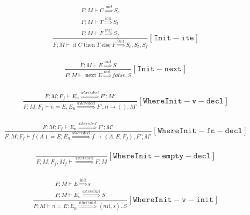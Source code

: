 \documentclass{scrartcl}
\DeclareMathOperator{\ifop}{if}
\DeclareMathOperator{\thenop}{then}
\DeclareMathOperator{\elseop}{else}
\DeclareMathOperator{\nextop}{next}
\begin{document}
    \begin{align*}
    \frac{
        \begin{matrix}
        F; M \vdash C \overset{init}{\Rightarrow} S_c \\
        F; M \vdash T \overset{init}{\Rightarrow} S_t \\
        F; M \vdash F \overset{init}{\Rightarrow} S_f
        \end{matrix}
    }{
        F; M \vdash \ifop C \thenop T \elseop F \overset{init}{\Rightarrow} S_c, S_t, S_f
    }[\mathtt{Init-ite}]
    \end{align*}
    
    \begin{align*}
    \frac{
        F; M \vdash E \overset{init}{\Rightarrow} S
    }{
        F; M \vdash \nextop E \overset{init}{\Rightarrow} false, S
    }[\mathtt{Init-next}]
    \end{align*}
    
    \begin{align*}
    \frac{
        \begin{matrix}
        F; M; F_f \vdash E_n \overset{wheredecl}{\Rightarrow} F'; M'
        \end{matrix}
    }{
        F; M; F_f \vdash n = E; E_n \overset{wheredecl}{\Rightarrow} F'; n \to (), M'
    }[\mathtt{WhereInit-v-decl}]
    \end{align*}
    
    \begin{align*}
    \frac{
        F; M; F_f \vdash E_n \overset{wheredecl}{\Rightarrow} F'; M'
    }{
        F; M; F_f \vdash f(A) = E; E_n \overset{wheredecl}{\Rightarrow} f \to \left<A, E, F_f \right>, F'; M'
    }[\mathtt{WhereInit-fn-decl}]
    \end{align*}
    
    \begin{align*}
    \frac{}{
        F; M; F_f; M_f \vdash \overset{wheredecl}{\Rightarrow} F; M
    }[\mathtt{WhereInit-empty-decl}]
    \end{align*}
    
    \begin{align*}
    \frac{
        \begin{matrix}
        F; M \vdash E \overset{init}{\Rightarrow} s \\
        F; M \vdash E_n \overset{whereinit}{\Rightarrow} S
        \end{matrix}
    }{
        F; M \vdash n = E; E_n \overset{whereinit}{\Rightarrow} \left<nil, s\right>, S
    }[\mathtt{WhereInit-v-init}]
    \end{align*}
    
\end{document}
